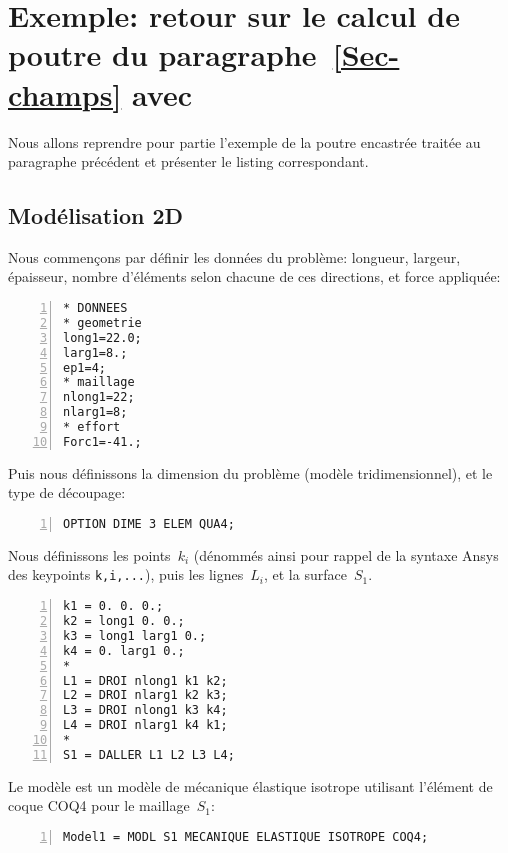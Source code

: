 \section{Exemple: retour sur le calcul de poutre du paragraphe~\ref{Sec-champs} avec \castem}
Nous allons reprendre pour partie l'exemple de la poutre encastrée traitée au paragraphe précédent et présenter le listing \castem correspondant.

\medskip
\subsection{Modélisation 2D}

Nous commençons par définir les données du problème: longueur, largeur, épaisseur, nombre d'éléments selon chacune de ces directions, et force appliquée:

\scriptsize
\begin{Verbatim}[numbers=left,numbersep=3pt]
* DONNEES
* geometrie
long1=22.0;
larg1=8.;
ep1=4;
* maillage
nlong1=22;
nlarg1=8;
* effort
Forc1=-41.;
\end{Verbatim}
\normalsize

\medskip
Puis nous définissons la dimension du problème (modèle tridimensionnel), et le type de découpage:

\scriptsize
\begin{Verbatim}[numbers=left,numbersep=3pt,firstnumber=last]
OPTION DIME 3 ELEM QUA4;
\end{Verbatim}
\normalsize

\medskip
Nous définissons les points~$k_i$ (dénommés ainsi pour rappel de la syntaxe Ansys des keypoints \verb|k,i,...|), puis les lignes~$L_i$, et la surface~$S_1$.

\scriptsize
\begin{Verbatim}[numbers=left,numbersep=3pt,firstnumber=last]
k1 = 0. 0. 0.;
k2 = long1 0. 0.;
k3 = long1 larg1 0.;
k4 = 0. larg1 0.;
*
L1 = DROI nlong1 k1 k2;
L2 = DROI nlarg1 k2 k3;
L3 = DROI nlong1 k3 k4;
L4 = DROI nlarg1 k4 k1;
*
S1 = DALLER L1 L2 L3 L4;
\end{Verbatim}
\normalsize

\medskip
Le modèle est un modèle de mécanique élastique isotrope utilisant l'élément de coque COQ4 pour le maillage~$S_1$:

\scriptsize
\begin{Verbatim}[numbers=left,numbersep=3pt,firstnumber=last]
Model1 = MODL S1 MECANIQUE ELASTIQUE ISOTROPE COQ4;
\end{Verbatim}
\normalsize

